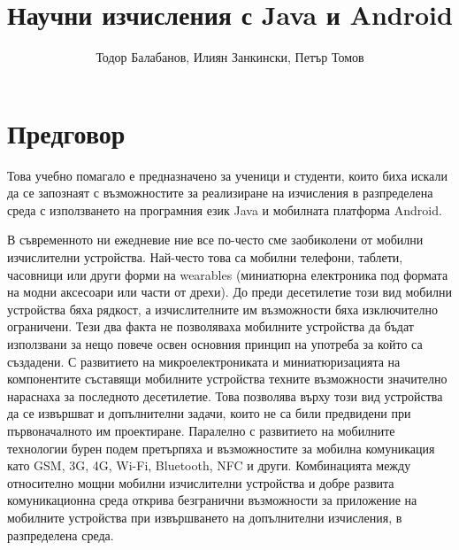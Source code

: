 \documentclass[book,14pt,oneside,openany]{memoir}
\title{Научни изчисления с Java и Android}
\author{Тодор Балабанов, Илиян Занкински, Петър Томов}
\begin{document}
\maketitle

\thispagestyle{empty}

\newpage
{}

\newpage
\tableofcontents

\renewcommand\thesection{\thechapter.\arabic{section}}
\renewcommand\thesubsection{\thesection.\arabic{subsection}}

\newpage
{}
\chapter*{Предговор}

Това учебно помагало е предназначено за ученици и студенти, които биха искали да се запознаят с възможностите за реализиране на изчисления в разпределена среда с използването на програмния език Java и мобилната платформа Android.

В съвременното ни ежедневие ние все по-често сме заобиколени от мобилни изчислителни устройства. Най-често това са мобилни телефони, таблети, часовници или други форми на wearables (миниатюрна електроника под формата на модни аксесоари или части от дрехи). До преди десетилетие този вид мобилни устройства бяха рядкост, а изчислителните им възможности бяха изключително ограничени. Тези два факта не позволяваха мобилните устройства да бъдат използвани за нещо повече освен основния принцип на употреба за който са създадени. С развитието на микроелектрониката и миниатюризацията на компонентите съставящи мобилните устройства техните възможности значително нараснаха за последното десетилетие. Това позволява върху този вид устройства да се извършват и допълнителни задачи, които не са били предвидени при първоначалното им проектиране. Паралелно с развитието на мобилните технологии бурен подем претърпяха и възможностите за мобилна комуникация като GSM, 3G, 4G, Wi-Fi, Bluetooth, NFC и други. Комбинацията между относително мощни мобилни изчислителни устройства и добре развита комуникационна среда открива безгранични възможности за приложение на мобилните устройства при извършването на допълнителни изчисления, в разпределена среда. 
\end{document}
